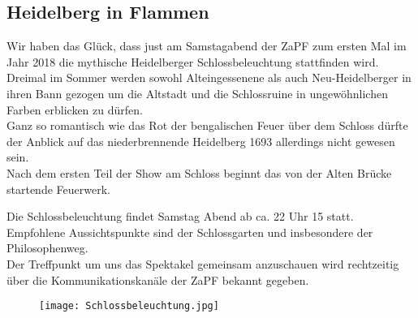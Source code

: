 \subsection*{Heidelberg in Flammen} %

Wir haben das Glück, dass just am Samstagabend der ZaPF zum ersten Mal im Jahr 2018 die mythische Heidelberger Schlossbeleuchtung stattfinden wird.\\
Dreimal im Sommer werden sowohl Alteingessenene als auch Neu-Heidelberger in ihren Bann gezogen um die Altstadt und die Schlossruine in ungewöhnlichen Farben erblicken zu dürfen.\\
Ganz so romantisch wie das Rot der bengalischen Feuer über dem Schloss dürfte der Anblick auf das niederbrennende Heidelberg 1693 allerdings nicht gewesen sein.\\Nach dem ersten Teil der Show am Schloss beginnt das von der Alten Brücke startende Feuerwerk. 

Die Schlossbeleuchtung findet Samstag Abend ab ca. 22 Uhr 15 statt. Empfohlene Aussichtspunkte sind der Schlossgarten und insbesondere der Philosophenweg. \\
Der Treffpunkt um uns das Spektakel gemeinsam anzuschauen wird rechtzeitig über die Kommunikationskanäle der ZaPF bekannt gegeben.
\begin{figure}
\centering
\texttt{[image: Schlossbeleuchtung.jpg]}
\end{figure}